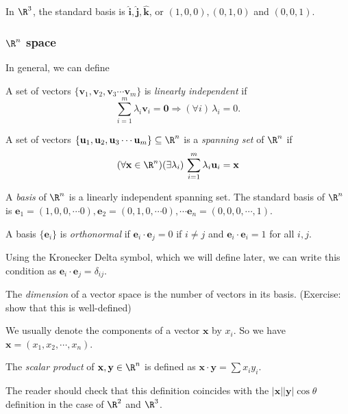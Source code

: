 \documentclass[a4paper]{article}
\begin{document}
In $\R^3$, the standard basis is $\mathbf{\hat{i}, \hat{j}, \hat{k}}$, or $(1, 0, 0), (0, 1, 0)$ and $(0, 0, 1)$.
\subsubsection{\texorpdfstring{$\R^n$}{Rn} space}
In general, we can define
\begin{defi}
  A set of vectors $\{\mathbf{v}_1, \mathbf{v}_2, \mathbf{v}_3\cdots \mathbf{v}_m\}$ is \emph{linearly independent} if
  \[
    \sum_{i = 1}^m\lambda_i\mathbf{v}_i = \mathbf{0} \Rightarrow (\forall i)\,\lambda_i = 0.
  \]
\end{defi}
\begin{defi}
  A set of vectors $\{\mathbf{u}_1, \mathbf{u}_2, \mathbf{u}_3\cdots \mathbf{u}_m\}\subseteq \R^n$ is a \emph{spanning set} of $\R^n$ if
  \[
    (\forall \mathbf{x} \in \R^n)(\exists \lambda_i)\,\sum_{i = 1}^m\lambda_i\mathbf{u}_i = \mathbf{x}
  \]
\end{defi}

\begin{defi}
  A \emph{basis} of $\R^n$ is a linearly independent spanning set. The standard basis of $\R^n$ is $\mathbf{e}_1 = (1, 0, 0, \cdots 0), \mathbf{e}_2 = (0, 1, 0, \cdots 0),\cdots \mathbf{e}_n = (0, 0, 0, \cdots, 1)$.
\end{defi}

\begin{defi}
  A basis $\{\mathbf{e}_i\}$ is \emph{orthonormal} if $\mathbf{e}_i\cdot \mathbf{e}_j = 0$ if $i\not= j$ and $\mathbf{e}_i\cdot \mathbf{e}_i = 1$ for all $i, j$.

  Using the Kronecker Delta symbol, which we will define later, we can write this condition as $\mathbf{e}_i \cdot \mathbf{e}_j = \delta_{ij}$.
\end{defi}

\begin{defi}
  The \emph{dimension} of a vector space is the number of vectors in its basis. (Exercise: show that this is well-defined)
\end{defi}
We usually denote the components of a vector $\mathbf{x}$ by $x_i$. So we have $\mathbf{x} = (x_1, x_2, \cdots, x_n)$.

\begin{defi}
  The \emph{scalar product} of $\mathbf{x, y}\in \R^n$ is defined as $\mathbf{x\cdot y} = \sum x_i y_i$.
\end{defi}
The reader should check that this definition coincides with the $|\mathbf{x}||\mathbf{y}|\cos\theta$ definition in the case of $\R^2$ and $\R^3$.
\end{document}
